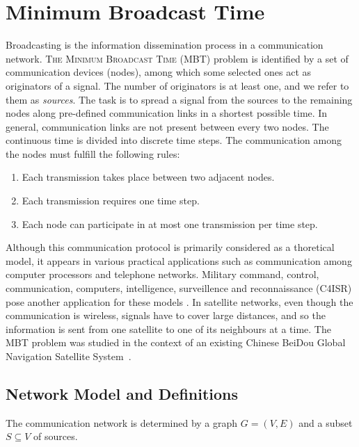 \chapter{Minimum Broadcast Time}\label{sec:mbt}

Broadcasting is the information dissemination process in a communication network.
\textsc{The Minimum Broadcast Time (MBT)} problem is identified by a set of communication devices (nodes), among which some selected ones act as originators of a signal.
The number of originators is at least one, and we refer to them as \emph{sources}.
The task is to spread a signal from the sources to the remaining nodes along pre-defined communication links in a shortest possible time.
In general, communication links are not present between every two nodes.
The continuous time is divided into discrete time steps.
The communication among the nodes must fulfill the following rules:
\begin{enumerate}
\item Each transmission takes place between two adjacent nodes.
\item Each transmission requires one time step.
\item Each node can participate in at most one transmission per time step.
\end{enumerate}

Although this communication protocol is primarily considered as a thoretical model, 
it appears in various practical applications such as communication among computer processors and telephone networks.
Military command, control, communication, computers, intelligence, surveillence and reconnaissance (C4ISR) pose another application for these models \cite{dekker02}.
In satellite networks, even though the communication is wireless, signals have to cover large distances, 
and so the information is sent from one satellite to one of its neighbours at a time.
The MBT problem was studied in the context of an existing Chinese BeiDou Global Navigation Satellite System~\cite{chu17}.

\section{Network Model and Definitions}

The communication network is determined by a graph $G=(V,E)$ and a subset $S\subseteq V$ of sources.

